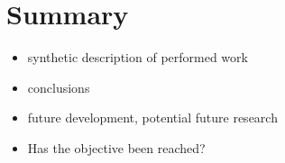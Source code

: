 \documentclass[a4paper,twoside,12pt]{book}
\begin{document}
%
%

\chapter{Summary}


\begin{itemize}
\item synthetic description of performed work
\item conclusions
\item  future development, potential future research
\item Has the objective been reached?
\end{itemize}
\end{document}
